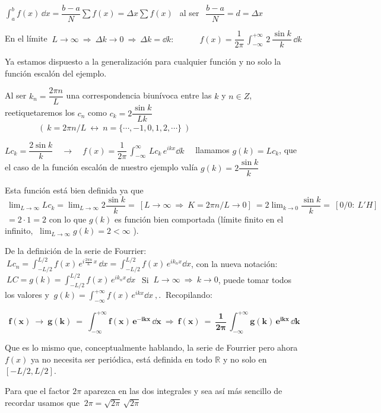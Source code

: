 \textcolor{gris}{ $\displaystyle \int_a^b f(x) \, \dd x = \dfrac{b-a}{N} \sum f(x) = \Delta x \sum f(x)\ \ $ al ser $\ \ \dfrac{b-a}{N}=d=\Delta x$ }


En el límite $\ L\to \infty \ \Rightarrow \ \Delta k\to 0 \ \Rightarrow \ \Delta
 k = \dd k: \qquad \quad f(x)=\dfrac 1{2\pi}\, \displaystyle \int_{-\infty}^{+\infty} \, 2\, \dfrac{\sin k}{k}\, \dd k$

Ya estamos dispuesto a la generalización para cualquier función y no solo la función escalón del ejemplo.

Al ser $k_n=\dfrac {2\pi n}L$ una correspondencia biunívoca entre las $k$ y $n\in Z$, reetiquetaremos los $c_n$ como $c_k=2\dfrac{\sin k}{Lk}$ \textcolor{gris}{$\qquad \qquad  \left(\  k=2\pi n/L \ \leftrightarrow  \ n=\{ \cdots , -1,0,1,2,\cdots \} \ \right)$}


$Lc_k=\dfrac{2\sin k}{k} \quad \to \quad f(x)=\dfrac 1{2\pi}\, \displaystyle \int_{-\infty}^{\infty} \, Lc_k\, e^{ikx}\dd k \quad$ llamamos $g(k)=Lc_k$, que el caso de la función escalón de nuestro ejemplo valía $g(k)=2\dfrac{\sin k}{k}$

Esta función está bien definida ya que $\ \displaystyle \lim_{L\to \infty} Lc_k=\lim_{L\to \infty} 2\dfrac{\sin k}{k} = \ [L\to \infty \ \Rightarrow \ K={2\pi n} / {L}\to 0 ] \ = 2 \lim_{k\to 0} \dfrac{\sin k}{k} = \ [0/0:\ L'H]\ $
$ \ = 2\cdot 1 = 2$ con lo que $g(k)$ es función bien comportada (límite finito en el infinito, $\ \displaystyle \lim_{L\to \infty} g(k)=2<\infty$ ).


De la definición de la serie de Fourrier: $\ \displaystyle Lc_n=\int_{-L/2}^{L/2} f(x)\, e^{i\frac{2\pi n}L \, x} \, \dd x = \int_{-L/2}^{L/2} f(x)\, e^{ik_n x} \dd x $, con la nueva notación:
$\ LC=g(k)= \displaystyle \int_{-L/2}^{L/2} f(x)\, e^{ik_n x} \dd x \ \ $
Si $\ L\to \infty \ \Rightarrow \ k\to 0$, puede tomar todos los valores y $ \ g(k)= \displaystyle \int_{-\infty}^{+\infty} f(x)\, e^{ik x} \dd x \ , . \ $ Recopilando:

$$\boldsymbol{ f(x) \ \to \ \displaystyle g(k)\ = \ \int_{-\infty}^{+\infty} f(x)\, e^{-ikx}\, \dd x \ \Rightarrow \ f(x)\ = \ \dfrac 1{2\pi}\, \int_{-\infty}^{+\infty} g(k)\, e^{ikx}\, \dd k }$$

Que es lo mismo que, conceptualmente hablando, la serie de Fourrier pero ahora $f(x)$ ya no necesita ser periódica, está definida en todo $\mathbb R$ y no solo en $[-L/2,L/2]$.

Para que el factor $2\pi$ aparezca en las dos integrales y sea así más sencillo de recordar usamos que $\ 2\pi =\sqrt{2\pi}\, \sqrt{2\pi}$


